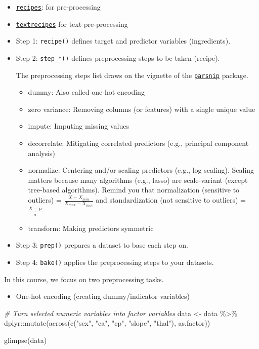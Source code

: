 \documentclass[
]{book}
\newenvironment{Shaded}{\begin{snugshade}}{\end{snugshade}}
\newcommand{\CommentTok}[1]{\textcolor[rgb]{0.56,0.35,0.01}{\textit{#1}}}
\newcommand{\FunctionTok}[1]{\textcolor[rgb]{0.00,0.00,0.00}{#1}}
\newcommand{\NormalTok}[1]{#1}
\newcommand{\OtherTok}[1]{\textcolor[rgb]{0.56,0.35,0.01}{#1}}
\newcommand{\SpecialCharTok}[1]{\textcolor[rgb]{0.00,0.00,0.00}{#1}}
\newcommand{\StringTok}[1]{\textcolor[rgb]{0.31,0.60,0.02}{#1}}
\providecommand{\tightlist}{%
  \setlength{\itemsep}{0pt}\setlength{\parskip}{0pt}}
\begin{document}
\begin{itemize}
\item
  \href{https://recipes.tidymodels.org/index.html}{\texttt{recipes}}: for pre-processing
\item
  \href{https://github.com/tidymodels/textrecipes}{\texttt{textrecipes}} for text pre-processing
\item
  Step 1: \texttt{recipe()} defines target and predictor variables (ingredients).
\item
  Step 2: \texttt{step\_*()} defines preprocessing steps to be taken (recipe).

  The preprocessing steps list draws on the vignette of the \href{https://www.tidymodels.org/find/parsnip/}{\texttt{parsnip}} package.

  \begin{itemize}
  \item
    dummy: Also called one-hot encoding
  \item
    zero variance: Removing columns (or features) with a single unique value
  \item
    impute: Imputing missing values
  \item
    decorrelate: Mitigating correlated predictors (e.g., principal component analysis)
  \item
    normalize: Centering and/or scaling predictors (e.g., log scaling). Scaling matters because many algorithms (e.g., lasso) are scale-variant (except tree-based algorithms). Remind you that normalization (sensitive to outliers) = \(\frac{X - X_{min}}{X_{max} - X_{min}}\) and standardization (not sensitive to outliers) = \(\frac{X - \mu}{\sigma}\)
  \item
    transform: Making predictors symmetric
  \end{itemize}
\item
  Step 3: \texttt{prep()} prepares a dataset to base each step on.
\item
  Step 4: \texttt{bake()} applies the preprocessing steps to your datasets.
\end{itemize}

In this course, we focus on two preprocessing tasks.

\begin{itemize}
\tightlist
\item
  One-hot encoding (creating dummy/indicator variables)
\end{itemize}

\begin{Shaded}
\begin{Highlighting}[]
\CommentTok{\# Turn selected numeric variables into factor variables }
\NormalTok{data }\OtherTok{\textless{}{-}}\NormalTok{ data }\SpecialCharTok{\%\textgreater{}\%}
\NormalTok{  dplyr}\SpecialCharTok{::}\FunctionTok{mutate}\NormalTok{(}\FunctionTok{across}\NormalTok{(}\FunctionTok{c}\NormalTok{(}\StringTok{"sex"}\NormalTok{, }\StringTok{"ca"}\NormalTok{, }\StringTok{"cp"}\NormalTok{, }\StringTok{"slope"}\NormalTok{, }\StringTok{"thal"}\NormalTok{), as.factor)) }

\FunctionTok{glimpse}\NormalTok{(data) }
\end{Highlighting}
\end{Shaded}
\end{document}
